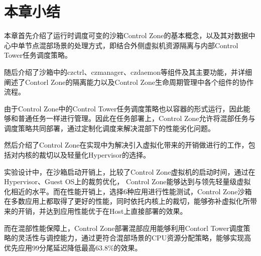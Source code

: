 \section{本章小结}

本章首先介绍了运行时调度可变的沙箱Control Zone的基本概念，以及其对数据中心中单节点混部场景的处理方式，即结合外侧虚拟机资源隔离与内部Control Tower任务调度策略。

随后介绍了沙箱中的czctrl、czmanager、czdaemon等组件及其主要功能，并详细阐述了Contorl Zone的隔离能力以及Control Zone生命周期管理中各个组件的协作流程。

由于Control Zone中的Control Tower任务调度策略也以容器的形式运行，因此能够和普通任务一样进行管理。因此在任务部署上，Control Zone允许将混部任务与调度策略共同部署，通过定制化调度来解决混部下的性能劣化问题。

然后介绍了Control Zone在实现中为解决引入虚拟化带来的开销做进行的工作，包括对内核的裁切以及轻量化Hypervisor的选择。

实验设计中，在沙箱启动开销上，比较了Control Zone虚拟机的启动时间，通过在Hypervisor、Guest OS上的裁剪优化， Control Zone能够达到与领先轻量级虚拟化相近的水平。而在性能开销上，选择6种应用进行性能测试，Control Zone沙箱在多数应用上都取得了更好的性能，同时依托内核上的裁切，能够弥补虚拟化所带来的开销，并达到应用性能优于在Host上直接部署的效果。

而在混部性能保障上，Control Zone部署混部应用能够利用Contorl Tower调度策略的灵活性与调控能力，通过更符合混部场景的CPU资源分配策略，能够实现高优先应用99分尾延迟降低最高63.8\%的效果。